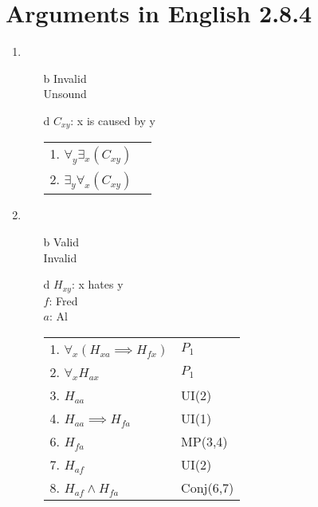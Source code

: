 \documentclass{article}
\begin{document}
	\section{Arguments in English 2.8.4}
	\begin{enumerate}
		\item
			\begin{enumerate}
				\item[b]
					Invalid\\
					Unsound	
				\item[d]
					$C_{xy}$: x is caused by y\\ 
					\begin{tabular}{l l}
						1. $\forall _y \exists _x (C_{xy})$\\
						2. $\exists _y \forall _x (C_{xy})$\\
					\end{tabular}
			\end{enumerate}
		\item
			\begin{enumerate}
				\item[b]
					Valid\\
					Invalid
				\item[d]
					$H_{xy}$: x hates y\\ 
					$f$: Fred\\
					$a$: Al\\
					\begin{tabular}{l l}
						1. $\forall _x (H_{xa} \implies H_{fx})$ & $P_1$\\
						2. $\forall _x H_{ax}$ & $P_1$\\ 
						3. $H_{aa}$ & UI(2)\\
						4. $H_{aa} \implies H_{fa}$ & UI(1)\\
						6. $H_{fa}$ & MP(3,4) \\
						7. $H_{af}$ & UI(2) \\
						8. $H_{af} \land H_{fa}$ & Conj(6,7)\\
					\end{tabular}


\end{enumerate}
\end{enumerate}
\end{document}
